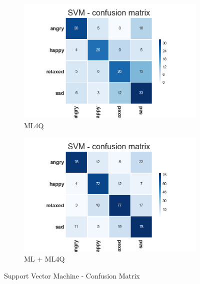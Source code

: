 \begin{figure}[H]
  \centering
  \begin{subfigure}[b]{0.49\linewidth}
    \includegraphics[width=\linewidth]{./chapters/chapter5/images/4Q/CM_SVM.png}
    \caption{ML4Q}
  \end{subfigure}
  \begin{subfigure}[b]{0.49\linewidth}
   \includegraphics[width=\linewidth]{./chapters/chapter5/images/join/CM_SVM.png}
    \caption{ML + ML4Q}
  \end{subfigure}
  \caption{Support Vector Machine - Confusion Matrix}
  \label{fig:svm}
\end{figure}

